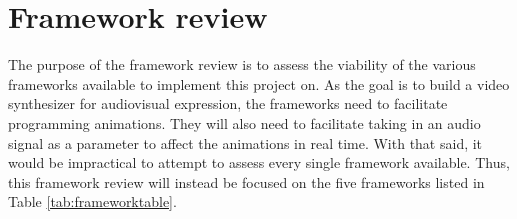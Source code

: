 \documentclass[../initial_thesis.tex]{subfiles}
\begin{document}
\section{Framework review}\label{sec:frameworkreview}
The purpose of the framework review is to assess the viability of the various frameworks available to implement this project on. As the goal is to build a video synthesizer for audiovisual expression, the frameworks need to facilitate programming animations. They will also need to facilitate taking in an audio signal as a parameter to affect the animations in real time. With that said, it would be impractical to attempt to assess every single framework available. Thus, this framework review will instead be focused on the five frameworks listed in Table \ref{tab:frameworktable}.
\end{document}
